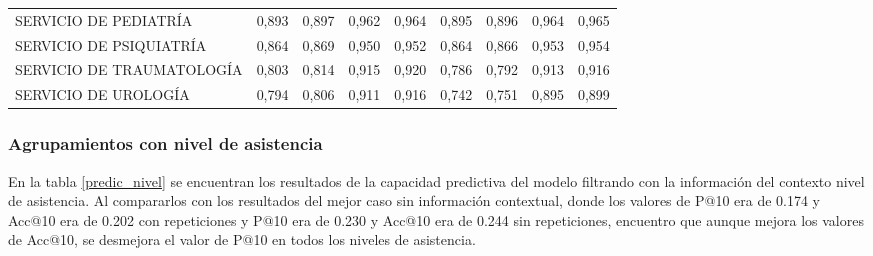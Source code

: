 \begin{table}[htb]
{\begin{tabular}{@{}lrrrrrrrr@{}}
SERVICIO DE PEDIATRÍA & 0,893 & 0,897 & 0,962 & 0,964 & 0,895 & 0,896 & 0,964 & 0,965 \\
SERVICIO DE PSIQUIATRÍA & 0,864 & 0,869 & 0,950 & 0,952 & 0,864 & 0,866 & 0,953 & 0,954 \\
SERVICIO DE TRAUMATOLOGÍA & 0,803 & 0,814 & 0,915 & 0,920 & 0,786 & 0,792 & 0,913 & 0,916 \\
SERVICIO DE UROLOGÍA & 0,794 & 0,806 & 0,911 & 0,916 & 0,742 & 0,751 & 0,895 & 0,899 \\ \bottomrule
\end{tabular}%
}
\end{table}

\subsubsection{Agrupamientos con nivel de asistencia}

En la tabla \ref{predic_nivel} se encuentran los resultados de la capacidad predictiva del modelo filtrando con la información del contexto nivel de asistencia. Al compararlos con los resultados  del mejor caso sin información contextual, donde los valores de P@10 era de \num{0.174} y Acc@10 era de \num{0.202} con repeticiones y P@10 era de \num{0.230} y Acc@10 era de \num{0.244} sin repeticiones, encuentro que aunque mejora los valores de Acc@10, se desmejora el valor de P@10 en todos los niveles de asistencia.

